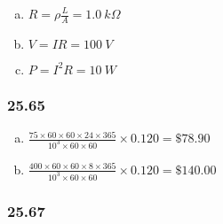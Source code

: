 \documentclass{article}
\begin{document}
\begin{enumerate}[(a)]
  \item $R = \rho \frac{L}{A} = \qty{1.0}{k \Omega}$

  \item $V = I R = \qty{100}{V}$

  \item $P = I^2 R = \qty{10}{W}$
\end{enumerate}

\subsubsection{25.65}

\begin{enumerate}[(a)]
  \item $\frac{75 \times 60 \times 60 \times 24 \times 365}{10^3 \times 60 \times 60} \times 0.120 = \$78.90$

  \item $\frac{400 \times 60 \times 60 \times 8 \times 365}{10^3 \times 60 \times 60} \times 0.120 = \$140.00$
\end{enumerate}

\subsubsection{25.67}
\end{document}
